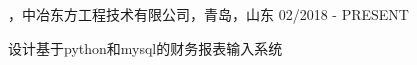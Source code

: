 
\begin{cventries}

\cvexperience
{，中冶东方工程技术有限公司，青岛，山东}
{02/2018 - PRESENT}
{
    \begin{cvitems}
    \item {设计基于python和mysql的财务报表输入系统}
    \end{cvitems}
}

\end{cventries}